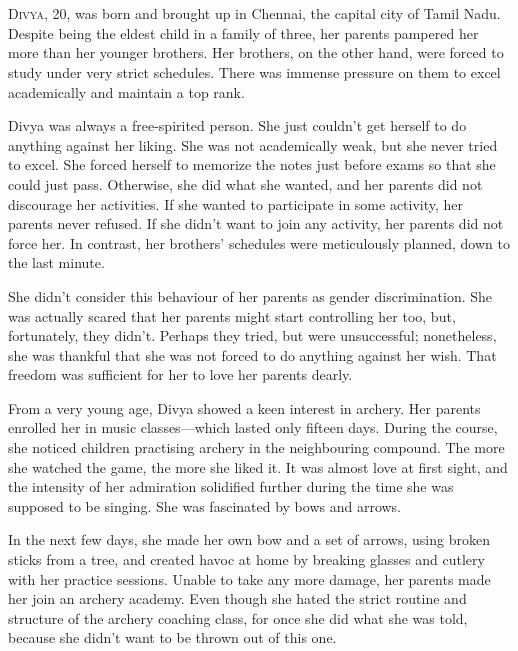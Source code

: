 \chapter{}

\lettrine{D}{ivya}, 20, was born and brought up in Chennai, the capital city of Tamil Nadu.
Despite being the eldest child in a family of three, her parents pampered her more than
her younger brothers. Her brothers, on the other hand, were forced to study under
very strict schedules. There was immense pressure on them to excel academically and maintain a top rank.

Divya was always a free-spirited person. She just couldn't get herself to do
anything against her liking. She was not academically weak, but she never tried to excel. She forced herself to memorize the notes just before exams so
that she could just pass. Otherwise, she did what she wanted, and her parents did
not discourage her activities. If she wanted to participate in some activity,
her parents never refused. If she didn't want to join any activity, her parents
did not force her. In contrast, her brothers' schedules were meticulously planned,
down to the last minute.

She didn't consider this behaviour of her parents as gender discrimination. She
was actually scared that her parents might start controlling her too, but, fortunately,
they didn't. Perhaps they tried, but were unsuccessful; nonetheless, she was thankful
that she was not forced to do anything against her wish. That freedom was sufficient
for her to love her parents dearly.

From a very young age, Divya showed a keen interest in archery. Her parents enrolled
her in music classes—which lasted only fifteen days. During the
course, she noticed children practising archery in the neighbouring compound.
The more she watched the game, the more she liked it. It was almost love at
first sight, and the intensity of her admiration solidified
further during the time she was supposed to be singing. She was fascinated by
bows and arrows.

In the next few days, she made her own bow and a set of arrows, using broken
sticks from a tree, and created havoc at home by breaking glasses and
cutlery with her practice sessions. Unable to take any more damage, her parents made her join an archery academy. Even though she hated the strict routine and structure of the archery coaching
class, for once she did what she was told, because she didn't want to be thrown out of
this one.

